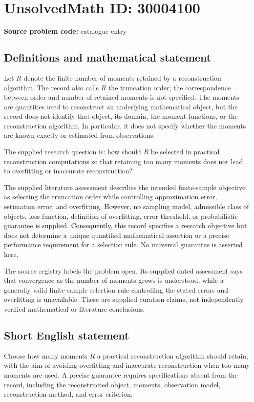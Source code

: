 \documentclass[11pt]{article}
\begin{document}
\section*{UnsolvedMath ID: 30004100}
\textbf{Source problem code:} catalogue entry
\subsection{Definitions and mathematical statement}
Let \(R\) denote the finite number of moments retained by a reconstruction algorithm. The record also calls \(R\) the truncation order; the correspondence between order and number of retained moments is not specified. The moments are quantities used to reconstruct an underlying mathematical object, but the record does not identify that object, its domain, the moment functions, or the reconstruction algorithm. In particular, it does not specify whether the moments are known exactly or estimated from observations.

The supplied research question is: how should \(R\) be selected in practical reconstruction computations so that retaining too many moments does not lead to overfitting or inaccurate reconstruction?

The supplied literature assessment describes the intended finite-sample objective as selecting the truncation order while controlling approximation error, estimation error, and overfitting. However, no sampling model, admissible class of objects, loss function, definition of overfitting, error threshold, or probabilistic guarantee is supplied. Consequently, this record specifies a research objective but does not determine a unique quantified mathematical assertion or a precise performance requirement for a selection rule. No universal guarantee is asserted here.

The source registry labels the problem open. Its supplied dated assessment says that convergence as the number of moments grows is understood, while a generally valid finite-sample selection rule controlling the stated errors and overfitting is unavailable. These are supplied curation claims, not independently verified mathematical or literature conclusions.
\subsection{Short English statement}
Choose how many moments \(R\) a practical reconstruction algorithm should retain, with the aim of avoiding overfitting and inaccurate reconstruction when too many moments are used. A precise guarantee requires specifications absent from the record, including the reconstructed object, moments, observation model, reconstruction method, and error criterion.
\end{document}
